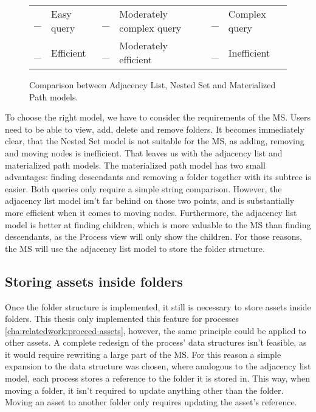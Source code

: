 \begin{figure}[H]
\vspace{.5em}

\begin{tabular}{r@{: }l r@{: }l r@{: }l}
  \goodcomplexity{\textcircled{}}\vspace{-.8em} \_ & Easy query & \mediumcomplexity{}\vspace{-.8em} \_ &
  Moderately complex query &  \badcomplexity{}\vspace{-.8em} \_ & Complex query \\

  \_ \goodefficency{\textcircled{}} & Efficient & \_ \mediumefficency{} &
  Moderately efficient &  \_ \badefficency{} & Inefficient \\
\end{tabular}


\caption{Comparison between Adjacency List, Nested Set and Materialized Path models.}
\label{fig:comparison-db-tree-models}
\end{figure}

To choose the right model, we have to consider the requirements of the MS.
Users need to be able to view, add, delete and remove folders.
It becomes immediately clear, that the Nested Set model is not suitable for the MS, as
adding, removing and moving nodes is inefficient.
That leaves us with the adjacency list and materialized path models.
%
The materialized path model has two small advantages: finding descendants and removing a
folder together with its subtree is easier. 
Both queries only require a simple string comparison.
%
%
However, the adjacency list model isn't far behind on those two points, and is
substantially more efficient when it comes to moving nodes.
Furthermore, the adjacency list model is better at finding children, which is more
valuable to the MS than finding descendants, as the Process view will only show the
children.
For those reasons, the MS will use the adjacency list model to store the folder structure.

\subsection{Storing assets inside folders}

Once the folder structure is implemented, it still is necessary to store assets inside
folders.
This thesis only implemented this feature for processes
\ref{cha:relatedwork:proceed-assets}, however, the same principle could be applied to
other assets.
A complete redesign of the process' data structures isn't feasible, as it would require
rewriting a large part of the MS.
For this reason a simple expansion to the data structure was chosen, where analogous to
the adjacency list model, each process stores a reference to the folder it is stored in.
This way, when moving a folder, it isn't required to update anything other than the
folder.
Moving an asset to another folder only requires updating the asset's reference.

